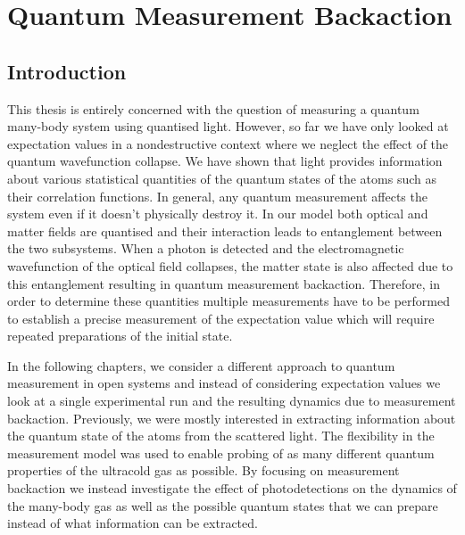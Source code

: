 
\chapter{Quantum Measurement Backaction}  
\label{chap:backaction}

\ifpdf
    \graphicspath{{Chapter4/Figs/Raster/}{Chapter4/Figs/PDF/}{Chapter4/Figs/}}
\else
    \graphicspath{{Chapter4/Figs/Vector/}{Chapter4/Figs/}}
\fi



\section{Introduction}

This thesis is entirely concerned with the question of measuring a
quantum many-body system using quantised light. However, so far we
have only looked at expectation values in a nondestructive context
where we neglect the effect of the quantum wavefunction collapse. We
have shown that light provides information about various statistical
quantities of the quantum states of the atoms such as their
correlation functions. In general, any quantum measurement affects the
system even if it doesn't physically destroy it. In our model both
optical and matter fields are quantised and their interaction leads to
entanglement between the two subsystems. When a photon is detected and
the electromagnetic wavefunction of the optical field collapses, the
matter state is also affected due to this entanglement resulting in
quantum measurement backaction. Therefore, in order to determine these
quantities multiple measurements have to be performed to establish a
precise measurement of the expectation value which will require
repeated preparations of the initial state.

In the following chapters, we consider a different approach to quantum
measurement in open systems and instead of considering expectation
values we look at a single experimental run and the resulting dynamics
due to measurement backaction. Previously, we were mostly interested
in extracting information about the quantum state of the atoms from
the scattered light. The flexibility in the measurement model was used
to enable probing of as many different quantum properties of the
ultracold gas as possible. By focusing on measurement backaction we
instead investigate the effect of photodetections on the dynamics of
the many-body gas as well as the possible quantum states that we can
prepare instead of what information can be extracted.

